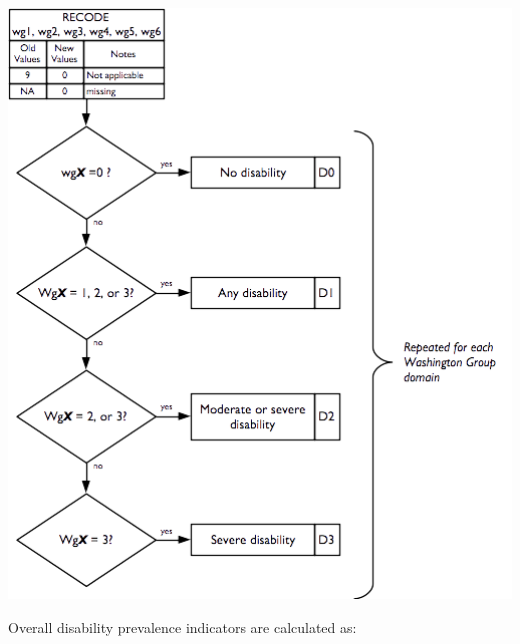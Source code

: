 \documentclass[12pt,a4paper]{book}
\theoremstyle{definition}
\theoremstyle{definition}
\theoremstyle{definition}
\theoremstyle{remark}
\begin{document}
\begin{center}\includegraphics[width=6.97in]{figures/indicators16} \end{center}

Overall disability prevalence indicators are calculated as:
\end{document}
